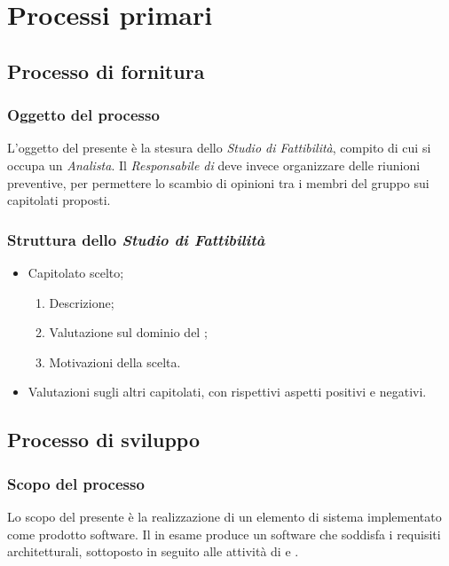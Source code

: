 \section{Processi primari}

	\subsection{Processo di fornitura}	
	\subsubsection{Oggetto del processo}
	L'oggetto del presente  è la stesura dello \textit{Studio di Fattibilità}, compito
	di cui si occupa un \textit{Analista}. Il \textit{Responsabile di } deve invece organizzare delle riunioni preventive, 
	per permettere lo scambio di opinioni tra i membri del gruppo sui capitolati proposti.
	\subsubsection{Struttura dello \textit{Studio di Fattibilità}}
		\begin{itemize}
			\item Capitolato scelto;
				\begin{enumerate}
					\item Descrizione;
					\item Valutazione sul dominio del ;
					\item Motivazioni della scelta.
				\end{enumerate}	
			\item Valutazioni sugli altri capitolati, con rispettivi aspetti positivi e negativi.
		\end{itemize}

	\subsection{Processo di sviluppo}
        \subsubsection{Scopo del processo}
        Lo scopo del presente  \`e la realizzazione di un elemento di sistema implementato come prodotto
        software. Il  in esame produce un software che soddisfa i requisiti architetturali, sottoposto
        in seguito alle attivit\`a di  e .
        
